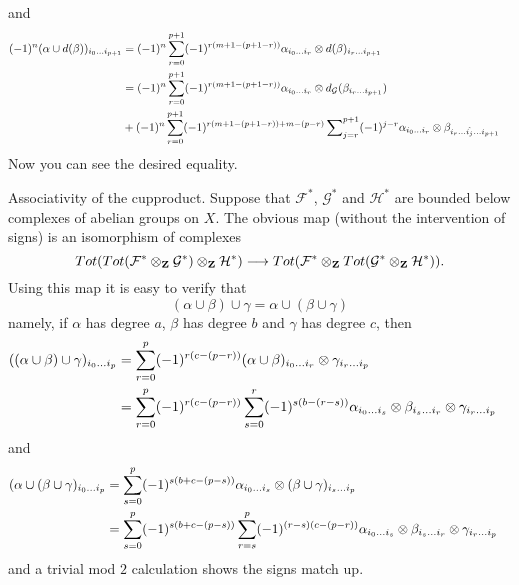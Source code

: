 and
\begin{align*}
(-1)^n (\alpha \cup d(\beta))_{i_0\ldots i_{p + 1}}
& =
(-1)^n
\sum_{r = 0}^{p + 1}
(-1)^{r(m + 1-(p + 1-r))}
\alpha_{i_0\ldots i_r} \otimes d(\beta)_{i_r\ldots i_{p + 1}}
\cr
& =
(-1)^n
\sum_{r = 0}^{p + 1}
(-1)^{r(m + 1-(p + 1-r))}
\alpha_{i_0\ldots i_r} \otimes d_{\mathcal G}(\beta_{i_r\ldots i_{p + 1}})
\cr
& +
(-1)^n
\sum_{r = 0}^{p + 1}
(-1)^{r(m + 1-(p + 1-r))+m-(p-r)}
\sum\nolimits_{j = r}^{p + 1}
(-1)^{j-r}
\alpha_{i_0\ldots i_r} \otimes \beta_{i_r\ldots\hat{i_j}\ldots i_{p + 1}}
\end{align*}
Now you can see the desired equality.

\medskip\noindent
Associativity of the cupproduct. Suppose that ${\mathcal F}^*$,
${\mathcal G}^*$ and ${\mathcal H}^*$ are bounded below
complexes of abelian groups on $X$. The obvious map
(without the intervention of signs) is an isomorphism
of complexes
$$
Tot(Tot({\mathcal F}^*\otimes_{\bf Z} {\mathcal G}^*)\otimes_{\bf Z}
{\mathcal H}^*)
\longrightarrow
Tot({\mathcal F}^*\otimes_{\bf Z} Tot({\mathcal G}^*\otimes_{\bf Z}
{\mathcal H}^*)).
$$
Using this map it is easy to verify that
$$
(\alpha \cup \beta) \cup \gamma = \alpha \cup ( \beta \cup \gamma)
$$
namely, if $\alpha$ has degree $a$, $\beta$ has degree $b$ and
$\gamma$ has degree $c$, then
\begin{align*}
((\alpha \cup \beta) \cup \gamma)_{i_0\ldots i_p}
& =
\sum_{r = 0}^p
(-1)^{r(c-(p-r))}
(\alpha\cup\beta)_{i_0\ldots i_r} \otimes \gamma_{i_r\ldots i_p}
\cr
& =
\sum_{r = 0}^p
(-1)^{r(c-(p-r))}
\sum_{s = 0}^r
(-1)^{s(b-(r-s))}
\alpha_{i_0\ldots i_s} \otimes \beta_{i_s\ldots i_r} \otimes
\gamma_{i_r\ldots i_p}
\end{align*}
and
\begin{align*}
(\alpha \cup (\beta \cup \gamma)_{i_0\ldots i_p}
& =
\sum_{s = 0}^p
(-1)^{s(b + c-(p-s))}
\alpha_{i_0\ldots i_s} \otimes (\beta \cup \gamma)_{i_s\ldots i_p}
\cr
& =
\sum_{s = 0}^p
(-1)^{s(b + c-(p-s))}
\sum_{r = s}^p
(-1)^{(r-s)(c-(p-r))}
\alpha_{i_0\ldots i_s} \otimes \beta_{i_s\ldots i_r} \otimes
\gamma_{i_r\ldots i_p}
\end{align*}
and a trivial mod $2$ calculation shows the signs match up.

